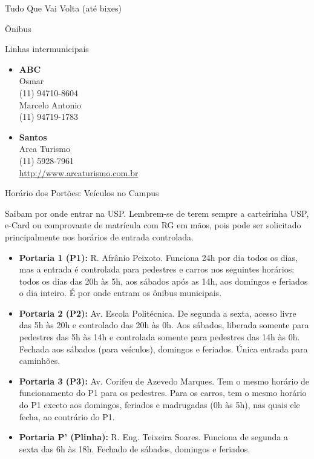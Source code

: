 \begin{secao}{Tudo Que Vai Volta (até bixes)}
\begin{subsecao}{Ônibus}
\begin{subsubsecao}{Linhas intermunicipais}
\begin{itemize}
  \item {\bf ABC}\\
    Osmar\\
    (11) 94710-8604\\
    Marcelo Antonio\\
    (11) 94719-1783

  \item {\bf Santos}\\
    Arca Turismo\\
    (11) 5928-7961\\
    \url{http://www.arcaturismo.com.br}

\end{itemize}

\end{subsubsecao}

\end{subsecao}


\begin{subsecao}{Horário dos Portões: Veículos no Campus}

Saibam por onde entrar na USP. Lembrem-se de terem sempre a carteirinha USP, e-Card
ou comprovante de matrícula com RG em mãos, pois pode ser solicitado principalmente
nos horários de entrada controlada.
\begin{itemize}
  \item {\bf Portaria 1 (P1):} R. Afrânio Peixoto. Funciona 24h por dia todos os
    dias, mas a entrada é controlada para pedestres e carros nos seguintes horários:
    todos os dias das 20h às 5h, aos sábados após as 14h, aos domingos e feriados o
    dia inteiro. É por onde entram os ônibus municipais.

  \item {\bf Portaria 2 (P2):} Av. Escola Politécnica. De segunda a sexta, acesso
  livre das 5h às 20h e controlado das 20h às 0h. Aos sábados, liberada somente para
  pedestres das 5h às 14h e controlada somente para pedestres das 14h às 0h.
  Fechada aos sábados (para veículos), domingos e feriados. Única entrada para caminhões.

  \item {\bf Portaria 3 (P3):} Av. Corifeu de Azevedo Marques. Tem o mesmo horário
    de funcionamento do P1 para os pedestres. Para os carros, tem o mesmo horário do P1
    exceto aos domingos, feriados e madrugadas (0h às 5h), nas quais ele fecha, ao
    contrário do P1.

  \item {\bf Portaria P' (Plinha):} R. Eng. Teixeira Soares. Funciona de segunda a
  sexta das 6h às 18h. Fechado de sábados, domingos e feriados.


\end{itemize}
\end{subsecao}
\end{secao}
